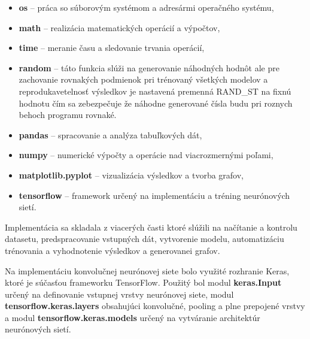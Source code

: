 \begin{itemize}[nolistsep, noitemsep]
    \item \textbf{os} -- práca so súborovým systémom a adresármi operačného systému,
    
    \item \textbf{math} -- realizácia matematických operácií a výpočtov,
    
    \item \textbf{time} -- meranie času a sledovanie trvania operácií,
    
    \item \textbf{random} -- táto funkcia slúži na generovanie náhodných hodnôt ale pre zachovanie rovnakých podmienok pri trénovaný všetkých modelov a reprodukavetelnosť výsledkov je nastavená premenná RAND\_ST na fixnú hodnotu čím sa zebezpečuje že náhodne generované čísla budu pri roznych behoch programu rovnaké.
    
    \item \textbf{pandas} -- spracovanie a analýza tabuľkových dát,
    
    \item \textbf{numpy} -- numerické výpočty a operácie nad viacrozmernými poľami,
    
    \item \textbf{matplotlib.pyplot} -- vizualizácia výsledkov a tvorba grafov,
    
    \item \textbf{tensorflow} -- framework určený na implementáciu a tréning neurónových sietí.
\end{itemize}
Implementácia sa skladala z viacerých časti ktoré slúžili na načítanie a kontrolu datasetu, predspracovanie vstupných dát, vytvorenie modelu, automatizáciu trénovania a vyhodnotenie výsledkov a generovanei grafov. 

Na implementáciu konvolučnej neurónovej siete bolo využité rozhranie Keras, ktoré je súčasťou frameworku TensorFlow. Použitý bol modul \textbf{keras.Input} určený na definovanie vstupnej vrstvy neurónovej siete, modul \textbf{tensorflow.keras.layers} obsahujúci konvolučné, pooling a plne prepojené vrstvy a modul \textbf{tensorflow.keras.models} určený na vytváranie architektúr neurónových sietí.

